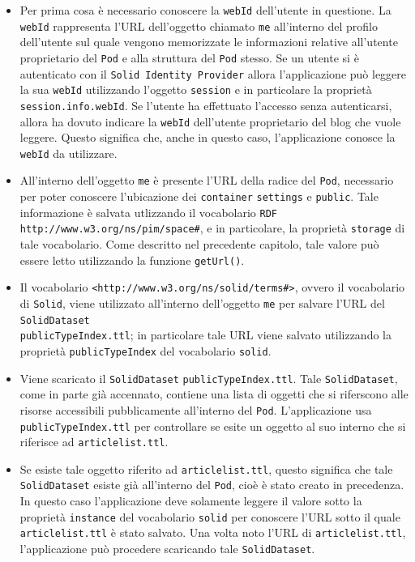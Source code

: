 \begin{itemize}
	\item Per prima cosa è necessario conoscere la {\tt webId} dell'utente in questione. La {\tt webId} rappresenta l'URL dell'oggetto chiamato {\tt me} all'interno del profilo dell'utente sul quale vengono memorizzate le informazioni relative all'utente proprietario del {\tt Pod} e alla struttura del {\tt Pod} stesso. Se un utente si è autenticato con il {\tt Solid Identity Provider} allora l'applicazione può leggere la sua {\tt webId} utilizzando l'oggetto {\tt session} e in particolare la proprietà {\tt session.info.webId}. Se l'utente ha effettuato l'accesso senza autenticarsi, allora ha dovuto indicare la {\tt webId} dell'utente proprietario del blog che vuole leggere. Questo significa che, anche in questo caso, l'applicazione conosce la {\tt webId} da utilizzare.
	\item All'interno dell'oggetto {\tt me} è presente l'URL della radice del {\tt Pod}, necessario per poter conoscere l'ubicazione dei {\tt container} {\tt settings} e {\tt public}. Tale informazione è salvata utlizzando il vocabolario {\tt RDF} {\tt http://www.w3.org/ns/pim/space\#}, e in particolare, la proprietà {\tt storage} di tale vocabolario. Come descritto nel precedente capitolo, tale valore può essere letto utilizzando la funzione {\tt getUrl()}.
	\item Il vocabolario {\tt <http://www.w3.org/ns/solid/terms\#>}, ovvero il vocabolario di {\tt Solid}, viene utilizzato all'interno dell'oggetto {\tt me} per salvare l'URL del {\tt SolidDataset}\\ {\tt publicTypeIndex.ttl}; in particolare tale URL viene salvato utilizzando la proprietà {\tt publicTypeIndex} del vocabolario {\tt solid}.
	\item Viene scaricato il {\tt SolidDataset} {\tt publicTypeIndex.ttl}. Tale {\tt SolidDataset}, come in parte già accennato, contiene una lista di oggetti che si riferscono alle risorse accessibili pubblicamente all'interno del {\tt Pod}. L'applicazione usa {\tt publicTypeIndex.ttl} per controllare se esite un oggetto al suo interno che si riferisce ad {\tt articlelist.ttl}.
	\item Se esiste tale oggetto riferito ad {\tt articlelist.ttl}, questo significa che tale {\tt SolidDataset} esiste già all'interno del {\tt Pod}, cioè è stato creato in precedenza. In questo caso l'applicazione deve solamente leggere il valore sotto la proprietà {\tt instance} del vocabolario {\tt solid} per conoscere l'URL sotto il quale {\tt articlelist.ttl} è stato salvato. Una volta noto l'URL di {\tt articlelist.ttl}, l'applicazione può procedere scaricando tale {\tt SolidDataset}.

\end{itemize}
